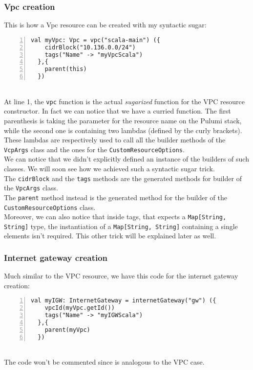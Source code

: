 \subsubsection{Vpc creation}
This is how a Vpc resource can be created with my syntactic sugar:
\begin{lstlisting}[numbers=left, numberstyle=\tiny, numbersep=-5pt, stepnumber=1]
  val myVpc: Vpc = vpc("scala-main") ({
    cidrBlock("10.136.0.0/24")
    tags("Name" -> "myVpcScala")
  },{
    parent(this)
  })
\end{lstlisting}\mbox{}\\
At line 1, the \texttt{vpc} function is the actual \textit{sugarized} function for the VPC resource constructor.
In fact we can notice that we have a curried function.
The first parenthesis is taking the parameter for the resource name on the Pulumi stack, while the second one is containing two lambdas (defined by the curly brackets).
These lambdas are respectively used to call all the builder methods of the \texttt{VcpArgs} class and the ones for the \texttt{CustomResourceOptions}.\\
We can notice that we didn't explicitly defined an instance of the builders of such classes.
We will soon see how we achieved such a syntactic sugar trick.\\
The \texttt{cidrBlock} and the \texttt{tags} methods are the generated methods for builder of the \texttt{VpcArgs} class.\\ 
The \texttt{parent} method instead is the generated method for the builder of the \texttt{CustomResourceOptions} class.\\
Moreover, we can also notice that inside tags, that expects a \texttt{Map[String, String]} type, the instantiation of a \texttt{Map[String, String]} containing a single elements isn't required.
This other trick will be explained later as well.

\subsubsection{Internet gateway creation}
Much similar to the VPC resource, we have this code for the internet gateway creation:
\begin{lstlisting}[numbers=left, numberstyle=\tiny, numbersep=-5pt, stepnumber=1]
  val myIGW: InternetGateway = internetGateway("gw") ({
    vpcId(myVpc.getId())
    tags("Name" -> "myIGWScala")
  },{
    parent(myVpc)
  })
\end{lstlisting}\mbox{}\\
The code won't be commented since is analogous to the VPC case.

